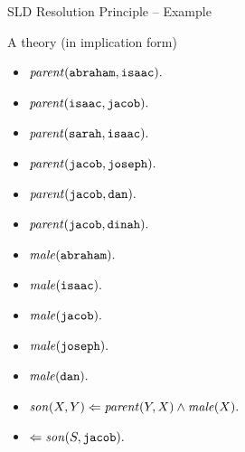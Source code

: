 \documentclass[presentation]{beamer}\mode<presentation>{\usetheme{AMSBolognaFC}}
\begin{document}
\begin{frame}[allowframebreaks]{SLD Resolution Principle -- Example}
    \begin{block}{A theory (in implication form)}
        \begin{multicols}{2}
            \begin{itemize}
                \item $\text{\textit{parent}}(\mathtt{abraham}, \mathtt{isaac}) \mathtt{.}$
                \item $\text{\textit{parent}}(\mathtt{isaac}, \mathtt{jacob}) \mathtt{.}$
                \item $\text{\textit{parent}}(\mathtt{sarah}, \mathtt{isaac}) \mathtt{.}$
                \item $\text{\textit{parent}}(\mathtt{jacob}, \mathtt{joseph}) \mathtt{.}$
                \item $\text{\textit{parent}}(\mathtt{jacob}, \mathtt{dan}) \mathtt{.}$
                \item $\text{\textit{parent}}(\mathtt{jacob}, \mathtt{dinah}) \mathtt{.}$
                \item $\text{\textit{male}}(\mathtt{abraham}) \mathtt{.}$
                \item $\text{\textit{male}}(\mathtt{isaac}) \mathtt{.}$
                \item $\text{\textit{male}}(\mathtt{jacob}) \mathtt{.}$
                \item $\text{\textit{male}}(\mathtt{joseph}) \mathtt{.}$
                \item $\text{\textit{male}}(\mathtt{dan}) \mathtt{.}$
            \end{itemize}
        \end{multicols}
        \begin{itemize}
            \item $\text{\textit{son}}(X, Y) \Leftarrow \text{\textit{parent}}(Y, X) \wedge \text{\textit{male}}(X) \mathtt{.}$
            \item $\Leftarrow \text{\textit{son}}(S, \mathtt{jacob}) \mathtt{.}$
        \end{itemize}
    \end{block}
\end{frame}
\end{document}
